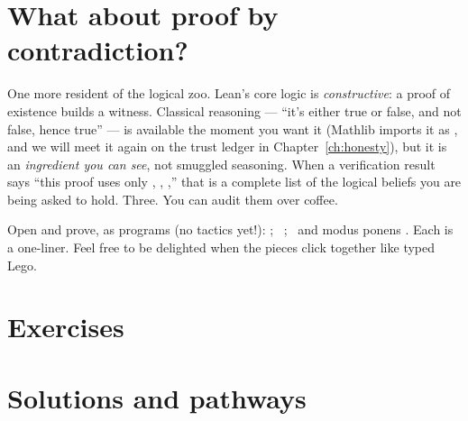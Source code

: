\section{What about proof by contradiction?}

One more resident of the logical zoo. Lean's core logic is
\emph{constructive}: a proof of existence builds a witness. Classical
reasoning --- ``it's either true or false, and not false, hence true'' --- is
available the moment you want it (Mathlib imports it as ,
and we will meet it again on the trust ledger in Chapter~\ref{ch:honesty}),
but it is an \emph{ingredient you can see}, not smuggled seasoning. When a
verification result says ``this proof uses only ,
, ,'' that is a complete list of the
logical beliefs you are being asked to hold. Three. You can audit them over
coffee.

\begin{tryit}
Open  and prove, as programs (no tactics yet!):
; \ ; \ and modus ponens
. Each is a one-liner. Feel free to be delighted
when the pieces click together like typed Lego.
\end{tryit}

\section*{Exercises}





\section*{Solutions and pathways}
\solutionsintro

